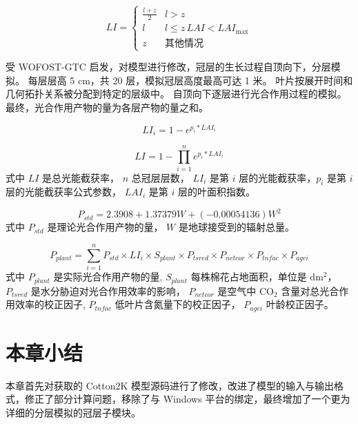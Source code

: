 \begin{equation}\label{eq:li}
    LI = \begin{cases}
        \frac{l + z}{2} & l > z                    \\
        l               & l\le z \, LAI<LAI_{\max} \\
        z               & \text{其他情况}
    \end{cases}
\end{equation}

受 WOFOST-GTC\cite{WOFOSTGTC} 启发，对模型进行修改，冠层的生长过程自顶向下，分层模拟。
每层层高 5 cm，共 20 层，模拟冠层高度最高可达 1 米。
叶片按展开时间和几何拓扑关系被分配到特定的层级中。
自顶向下逐层进行光合作用过程的模拟。
最终，光合作用产物的量为各层产物的量之和。

\begin{equation}
    LI_i = 1 - e^{p_i * LAI_i}
\end{equation}

\begin{equation}
    LI = 1 - \prod^{n}_{i=1}e^{p_i * LAI_i}
\end{equation}
式中 $LI$ 是总光能截获率， $n$ 总冠层层数， $LI_i$ 是第 $i$ 层的光能截获率，$p_i$ 是第 $i$ 层的光能截获率公式参数，
$LAI_i$ 是第 $i$ 层的叶面积指数。

\begin{equation}%
    P_{std} = 2.3908 + 1.37379 W + (-0.00054136) W^2%
\end{equation}%
式中 $P_{std}$ 是理论光合作用产物的量， $W$ 是地球接受到的辐射总量。%

\begin{equation}%
    P_{plant} = \sum^n_{i=1} P_{std} \times LI_i \times S_{plant} \times P_{tsred} \times P_{netcor} \times P_{tnfac} \times P_{agei}%
\end{equation}%
式中 $P_{plant}$ 是实际光合作用产物的量, $S_{plant}$ 每株棉花占地面积，单位是 $\mathrm{dm^2}$，%
$P_{tsred}$ 是水分胁迫对光合作用效率的影响，%
$P_{netcor}$ 是空气中 $\mathrm{CO_2}$ 含量对总光合作用效率的校正因子,%
$P_{tnfac}$ 低叶片含氮量下的校正因子，%
$P_{agei}$ 叶龄校正因子。

\section{本章小结}
本章首先对获取的 Cotton2K 模型源码进行了修改，改进了模型的输入与输出格式，修正了部分计算问题，移除了与 Windows 平台的绑定，最终增加了一个更为详细的分层模拟的冠层子模块。
